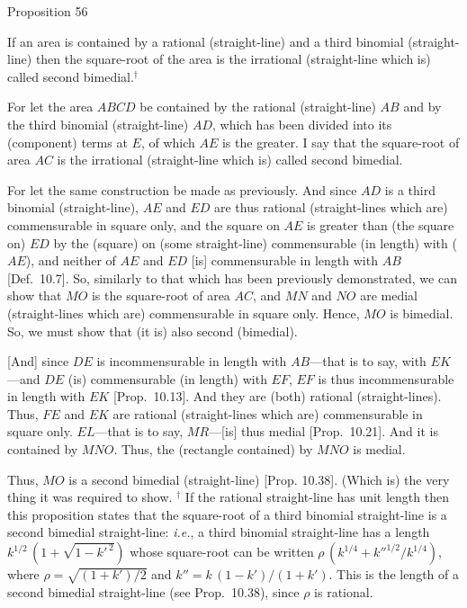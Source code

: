 
\begin{center}
{\large Proposition 56}
\end{center}

If an area is contained by a rational (straight-line)
and a third binomial (straight-line) then the square-root of the area is
the irrational (straight-line which is) called second bimedial.$^\dag$

\epsfysize=1.3in
\centerline{}

For let the area $ABCD$ be contained by the rational (straight-line)
$AB$ and by the third binomial (straight-line) $AD$, which has been divided into
its (component) terms at $E$, of which $AE$ is the greater.  I say that
the square-root of area $AC$ is the irrational (straight-line which is)
called second bimedial.

For let the same construction be made as  previously. And since
$AD$ is a third binomial (straight-line), $AE$ and $ED$
are thus rational (straight-lines which are) commensurable in square only,
and the square on $AE$ is greater than (the square on) $ED$
by the (square) on (some straight-line) commensurable (in length) with
($AE$), and neither of $AE$ and $ED$ [is] commensurable in length
with $AB$ [Def.~10.7]. So, similarly
to that which has been previously demonstrated, we can show that
$MO$ is the square-root of  area $AC$, and $MN$ and $NO$
are medial (straight-lines which are) commensurable in square only.
Hence, $MO$ is bimedial. So, we must show that (it is)
also second (bimedial).

\mbox{[}And] since $DE$ is incommensurable in length with $AB$---that is to say,
with $EK$---and $DE$ (is) commensurable (in length) with $EF$,
$EF$ is thus incommensurable in length with $EK$ [Prop.~10.13]. And they are (both)
rational (straight-lines). Thus, $FE$ and $EK$ are rational (straight-lines which are) commensurable in square only. $EL$---that is to say, $MR$---[is] thus medial [Prop.~10.21]. And it
is contained by $MNO$.  Thus, the (rectangle contained) by $MNO$
is medial.

Thus, $MO$ is a second bimedial (straight-line) [Prop. 10.38]. (Which is) the very thing it was required to show.
{\footnotesize\noindent $^\dag$ If the rational straight-line has unit length then this proposition states that the square-root of 
a third binomial straight-line is a second bimedial straight-line: {\em i.e.}, 
a third binomial straight-line has a length $k^{1/2}\,(1+\sqrt{1-k'^{\,2}})$ whose
square-root can be written $\rho\,(k^{1/4}+k''^{1/2}/k^{1/4})$, where $\rho=\sqrt{(1+k')/2}$ and $k''=k\,(1-k')/(1+k')$. This is the length of a second bimedial straight-line (see Prop.~10.38), since $\rho$ is rational.}

